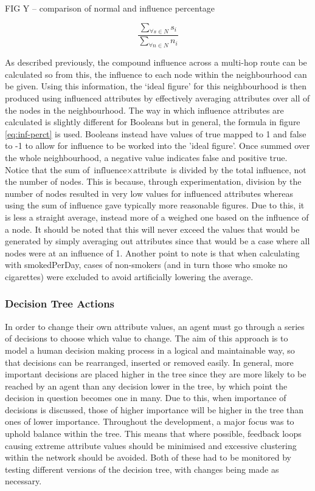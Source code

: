 \documentclass[]{report}
\begin{document}
FIG Y – comparison of normal and influence percentage

\begin{equation}
\label{eq:inf-perct}
\frac{\sum_{\forall s \in N} s_{i}}{\sum_{\forall n \in N} n_{i}}
\end{equation}

As described previously, the compound influence across a multi-hop route can be calculated so from this, the influence to each node within the neighbourhood can be given. Using this information, the `ideal figure' for this neighbourhood is then produced using influenced attributes by effectively averaging attributes over all of the nodes in the neighbourhood. The way in which influence attributes are calculated is slightly different for Booleans but in general, the formula in figure \ref{eq:inf-perct} is used. Booleans instead have values of true mapped to 1 and false to -1 to allow for influence to be worked into the 'ideal figure'. Once summed over the whole neighbourhood, a negative value indicates false and positive true. Notice that the sum of $\text{influence} \times \text{attribute}$ is divided by the total influence, not the number of nodes. This is because, through experimentation, division by the number of nodes resulted in very low values for influenced attributes whereas using the sum of influence gave typically more reasonable figures. Due to this, it is less a straight average, instead more of a weighed one based on the influence of a node. It should be noted that this will never exceed the values that would be generated by simply averaging out attributes since that would be a case where all nodes were at an influence of 1. Another point to note is that when calculating with smokedPerDay, cases of non-smokers (and in turn those who smoke no cigarettes) were excluded to avoid artificially lowering the average.

\label{sec:neighbourhood}
\subsubsection{Decision Tree Actions}
In order to change their own attribute values, an agent must go through a series of decisions to choose which value to change. The aim of this approach is to model a human decision making process in a logical and maintainable way, so that decisions can be rearranged, inserted or removed easily. In general, more important decisions are placed higher in the tree since they are more likely to be reached by an agent than any decision lower in the tree, by which point the decision in question becomes one in many. Due to this, when importance of decisions is discussed, those of higher importance will be higher in the tree than ones of lower importance. Throughout the development, a major focus was to uphold balance within the tree. This means that where possible, feedback loops causing extreme attribute values should be minimised and excessive clustering within the network should be avoided. Both of these had to be monitored by testing different versions of the decision tree, with changes being made as necessary.
\end{document}
